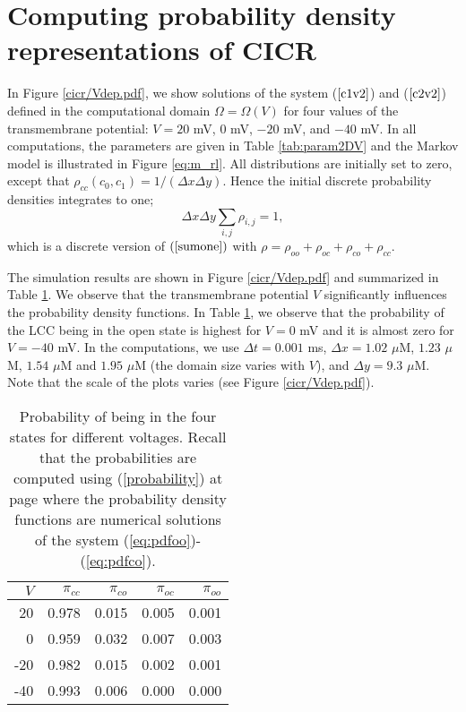 \section{Computing probability density representations of CICR}

 In Figure \ref{cicr/Vdep.pdf}, we show solutions of the system ($\ref{c1v2}$) and ($\ref{c2v2}$) defined in the computational domain 
 $\Omega=\Omega(V)$ for four values of the transmembrane potential: $V = 20$ mV, $0$ mV, $-20$ mV, and $-40$ mV. In all computations, the parameters are given in Table \ref{tab:param2DV} and the Markov model is illustrated in Figure \ref{eq:m_rl}. 
All distributions are initially set to zero, except that $\rho_{cc}(c_0,c_1)= 1/(\Delta x \Delta y)$. Hence the initial discrete probability densities integrates to one;
\begin{equation}
\Delta x \Delta y \sum_{i,j}  \rho_{i,j}=1,  %
\end{equation}
which is a discrete version of $(\ref{sumone})$ with $\rho=\rho_{oo}+\rho_{oc}+\rho_{co}+\rho_{cc}$.  

The simulation results are shown in Figure \ref{cicr/Vdep.pdf}  and summarized in Table \ref{tab:stat2DV}. We observe that the transmembrane potential $V$ significantly influences the probability density functions. In Table \ref{tab:stat2DV}, we observe that the probability of the LCC being in the open state is highest for $V=0$ mV and it is almost zero for $V=-40$ mV. In the computations, we use $\Delta t=0.001$ ms, $\Delta x=1.02$ $\mu$M, $1.23$ $\mu$M, $1.54$ $\mu$M and $1.95$ $\mu$M (the domain size varies with $V$), and $\Delta y=9.3$ $\mu$M. Note that the scale of the plots varies (see Figure \ref{cicr/Vdep.pdf}).



\begin{table}  \begin{center}
\begin{tabular}{|r|r|r|r|r|} \hline
 $V$ & $\pi_{cc}$ & $\pi_{co}$ & $\pi_{oc}$ & $\pi_{oo}$ \\ \hline
20 & 0.978 & 0.015 & 0.005 & 0.001 \\ \hline
0 & 0.959 & 0.032 & 0.007 & 0.003 \\ \hline
-20 & 0.982 & 0.015 & 0.002 & 0.001 \\ \hline
-40 & 0.993 & 0.006 & 0.000 & 0.000 \\ \hline
\end{tabular} \end{center}
\caption{Probability of being in the four states for different voltages. Recall that the probabilities are computed
using  (\ref{probability}) at page \pageref{probability} where the probability density functions are numerical solutions
of the system (\ref{eq:pdfoo})-(\ref{eq:pdfco}).}
\label{tab:stat2DV}
\end{table}




